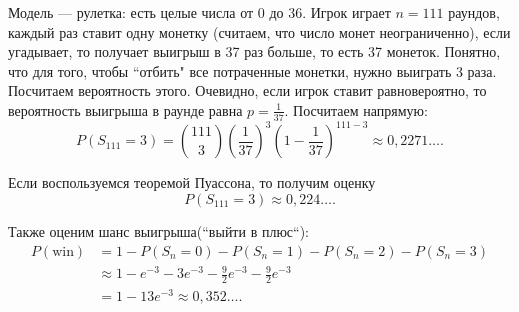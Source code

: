 \begin{example} Модель --- рулетка: есть целые числа от $0$ до $36$. Игрок играет $n=111$ раундов, каждый раз ставит одну монетку (считаем, что число монет неограниченно), если угадывает, то получает выигрыш в 37 раз больше, то есть 37 монеток. Понятно, что для того, чтобы ``отбить" все потраченные монетки, нужно выиграть 3 раза. Посчитаем вероятность этого. Очевидно, если игрок ставит равновероятно, то вероятность выигрыша в раунде равна $p=\frac{1}{37}$.
   Посчитаем напрямую:
    $$P(S_{111} = 3) = \binom{111}{3}\left(\frac{1}{37}\right)^3\left(1-\frac{1}{37}\right)^{111-3} \approx 0,2271\ldots.$$ 

    Если воспользуемся теоремой Пуассона, то получим оценку
    $$P(S_{111} = 3) \approx 0,224\ldots.$$
    
   Также оценим шанс выигрыша(``выйти в плюс``):
   \begin{align*}
       P(\text{win}) &= 1 - P(S_n = 0) - P(S_n = 1) - P(S_n = 2) - P(S_n = 3) \\&\approx
        1 - e^{-3} - 3e^{-3} - \frac{9}{2}e^{-3} - \frac{9}{2}e^{-3} \\&= 1 - 13e^{-3}\approx 0,352\ldots.
   \end{align*}
  
\end{example}
\newpage
